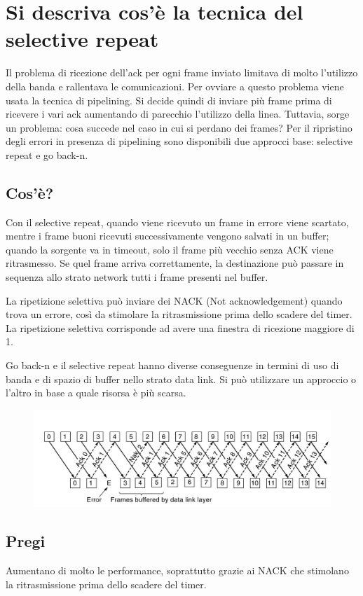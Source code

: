 \section{Si descriva cos'è la tecnica del selective repeat}

Il problema di ricezione dell'ack per ogni frame inviato limitava di molto l'utilizzo della banda e rallentava le comunicazioni.
Per ovviare a questo problema viene usata la tecnica di pipelining.
Si decide quindi di inviare più frame prima di ricevere i vari ack aumentando di parecchio l'utilizzo della linea.
Tuttavia, sorge un problema: cosa succede nel caso in cui si perdano dei frames?
Per il ripristino degli errori in presenza di pipelining sono disponibili due approcci base: selective repeat e go back-n.
\subsection{Cos'è?}
Con il selective repeat, quando viene ricevuto un frame in errore viene scartato, mentre i frame buoni ricevuti successivamente vengono salvati in un buffer;
quando la sorgente va in timeout, solo il frame più vecchio senza ACK viene ritrasmesso.
Se quel frame arriva correttamente, la destinazione può passare in sequenza allo strato network tutti i frame presenti nel buffer.

La ripetizione selettiva può inviare dei NACK (Not acknowledgement) quando trova un errore, così da stimolare la ritrasmissione prima dello scadere del timer.
La ripetizione selettiva corrisponde ad avere una finestra di ricezione maggiore di 1.

Go back-n e il selective repeat hanno diverse conseguenze in termini di uso di banda e di spazio di buffer nello strato data link.
Si può utilizzare un approccio o l'altro in base a quale risorsa è più scarsa.

\begin{figure}[H]
\centering
\includegraphics[scale=0.8]{res/img/21_SelectiveRepeat.png}
\end{figure}
 
\subsection{Pregi}
Aumentano di molto le performance, soprattutto grazie ai NACK che stimolano la ritrasmissione prima dello scadere del timer.

